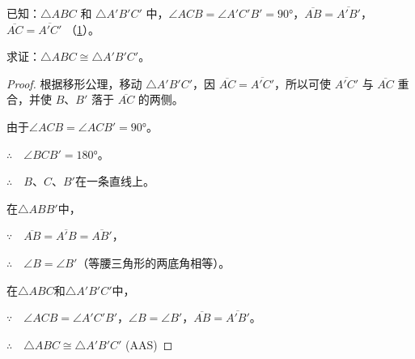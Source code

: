 \begin{figure}
    \begin{minipage}[t]{0.48\linewidth}
    \centering
\begin{tikzpicture}[>=latex, scale=1]
    \end{tikzpicture}
    \caption{}\label{fig:3-46}
    \end{minipage}
    \begin{minipage}[t]{0.48\linewidth}
    \centering
    \begin{tikzpicture}[>=latex, scale=1]
    \end{tikzpicture}
    \caption{}\label{fig:3-47}
    \end{minipage}
    \end{figure}


\begin{example}
已知：$\triangle ABC$ 和 $\triangle A'B'C'$ 中，$\angle ACB=\angle A'C'B'=\ang{90}$，$\overline{AB}=\overline{A'B'}$，$\overline{AC}=\overline{A'C'}$ （\cref{fig:3-47}）。

求证：$\triangle ABC\cong \triangle A'B'C'$。
\end{example}

\begin{proof}
根据移形公理，移动 $\triangle A'B'C'$，因 $\overline{AC}=\overline{A'C'}$，所以可使 $\overline{A'C'}$ 与 $\overline{AC}$ 重合，并使 $B$、$B'$ 落于 $\overline{AC}$ 的两侧。

由于$\angle ACB=\angle ACB'=\ang{90}$。

$\therefore\quad \angle  BCB'=\ang{180}$。

$\therefore\quad B$、$C$、$B'$在一条直线上。

在$\triangle ABB'$中，

$\because\quad \overline{AB}=\overline{A'B}=\overline{AB'}$，

$\therefore\quad \angle B=\angle B'$（等腰三角形的两底角相等）。

在$\triangle ABC$和$\triangle A'B'C'$中，

$\because\quad \angle ACB=\angle A'C'B'$，$\angle B=\angle B'$，$\overline{AB}=\overline{A'B'}$。

$\therefore\quad \triangle ABC\cong \triangle A'B'C'$ (AAS)    
\end{proof}

